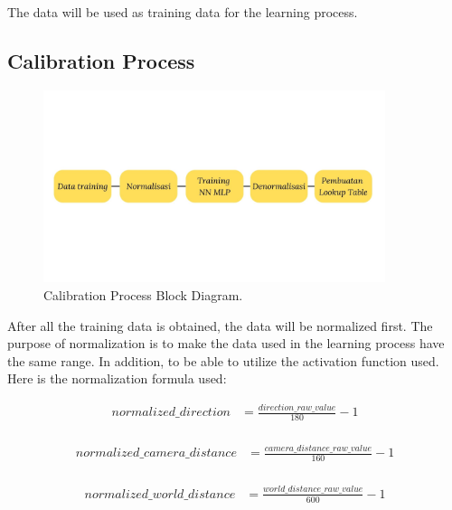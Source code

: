 The data will be used as training data for the learning process.

\subsection{Calibration Process}
\label{sec:deskripsisiste2}

\begin{figure}[H]
  \centering
  \includegraphics[width=10cm]{gambar/bab3223.jpg}
  \caption{Calibration Process Block Diagram.}
  \label{fig:diag32}
\end{figure}

After all the training data is obtained, the data will be normalized first. The purpose of normalization is to make the data used in the learning process have the same range. In addition, to be able to utilize the activation function used. Here is the normalization formula used:

\begin{equation}
  \begin{aligned}
    normalized\_direction &= \frac{direction\_raw\_value}{180} - 1 \\
  \end{aligned}
\end{equation}

\begin{equation}
  \begin{aligned}
    normalized\_camera\_distance &= \frac{camera\_distance\_raw\_value}{160} - 1 \\
  \end{aligned}
\end{equation}

\begin{equation}
  \begin{aligned}
    normalized\_world\_distance &= \frac{world\_distance\_raw\_value}{600} - 1 \\
  \end{aligned}
\end{equation}

